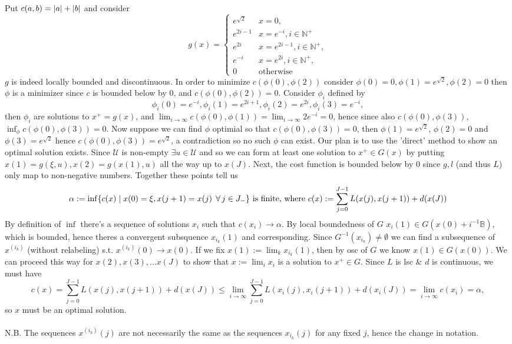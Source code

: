 \documentclass{article}
\newenvironment{ex}[1]
  {\renewcommand\theexercise{#1}\exercise}
  {\endexercise}
\newcommand{\B}{\mathbb{B}}
\begin{document}
\begin{ex}{3.18}
  Put $c(a, b) = \lvert a\rvert + \lvert b\rvert$ and consider
  $$
  g(x) = \begin{cases}
    e^{\sqrt{2}} & x = 0, \\
    e^{2i - 1} & x = e^{-i}, i \in \mathbb{N}^+ \\
    e^{2i} & x = e^{2i-1}, i \in \mathbb{N}^+, \\
    e^{-i} & x = e^{2i}, i \in \mathbb{N}^+, \\
    0 & \text{otherwise}
  \end{cases}
  $$
  $g$ is indeed locally bounded and discontinuous. In order to minimize $c(\phi(0), \phi(2))$ consider $\phi(0) = 0, \phi(1) = e^{\sqrt{2}}, \phi(2) = 0$ then $\phi$ is a minimizer since $c$ is bounded below by $0$, and $c(\phi(0), \phi(2)) = 0$. Consider $\phi_i$ defined by
  $$
  \phi_i(0) = e^{-i}, \phi_i(1) = e^{2i + 1}, \phi_i(2) = e^{2i}, \phi_i(3) = e^{-i},
  $$
  then $\phi_i$ are solutions to $x^+ = g(x)$, and $\lim_{i \to \infty} c(\phi(0), \phi(1)) = \lim_{i \to \infty} 2e^{-i} = 0$, hence since also $c(\phi(0), \phi(3))$, $\inf_\phi c(\phi(0), \phi(3)) = 0$. Now suppose we can find $\phi$ optimial so that $c(\phi(0), \phi(3)) = 0$, then $\phi(1) = e^{\sqrt{2}}$, $\phi(2) = 0$ and $\phi(3) = e^{\sqrt{2}}$ hence $c(\phi(0), \phi(3)) = e^{\sqrt{2}}$, a contradiction so no such $\phi$ can exist.
\end{ex}
\begin{ex}{3.20}
  Our plan is to use the 'direct' method to show an optimal solution exists. Since $\mathcal{U}$ is non-empty $\exists u \in \mathcal{U}$ and so we can form at least one solution to $x^+ \in G(x)$ by putting $x(1) = g(\xi, u), x(2) = g(x(1), u)$ all the way up to $x(J)$. Next, the cost function is bounded below by $0$ since $g, l$ (and thus $L$) only map to non-negative numbers. Together these points tell us
  $$
  \alpha := \inf\braces{ c(x) \mid x(0) = \xi, x(j+1) = x(j) \, \forall j \in J_{-} } \text{ is finite, where } c(x) := \sum_{j=0}^{J-1} L(x(j), x(j+1)) + d(x(J))
  $$
  By definition of $\inf$ there's a sequence of solutions $x_i$ such that $c(x_i) \to \alpha$. By local boundedness of $G$ $x_i(1) \in G(x(0) + i^{-1}\B)$, which is bounded, hence theres a convergent subsquence $x_{i_k}(1)$ and corresponding. Since $G^{-1}(x_{i_k}) \ne \emptyset$ we can find a subsequence of $x^{(i_k)}$ (without relabeling) s.t. $x^{(i_k)}(0) \to x(0)$. If we fix $x(1) := \lim_k x_{i_k}(1)$, then by osc of $G$ we know $x(1) \in G(x(0))$. We can proceed this way for $x(2), x(3), ... x(J)$ to show that $x := \lim_i x_i$ is a solution to $x^+ \in G$. Since $L$ is lsc \& $d$ is continuous, we must have
  $$
  c(x) = \sum_{j=0}^{J-1} L(x(j), x(j+1)) + d(x(J)) \le \lim_{i \to \infty} \sum_{j=0}^{J-1} L(x_i(j), x_i(j+1)) + d(x_i(J)) = \lim_{i \to \infty} c(x_i) = \alpha,
  $$
  so $x$ must be an optimal solution.
  \, \\
  \, \\
  N.B. The sequences $x^{(i_k)}(j)$ are not necessarily the same as the sequences $x_{i_k}(j)$ for any fixed $j$, hence the change in notation.
\end{ex}
\end{document}
